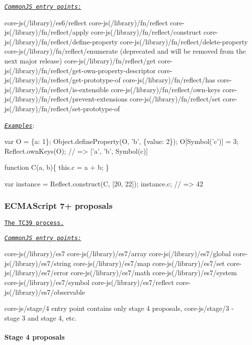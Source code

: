  \href{#commonjs}{\tt {\itshape Common\+JS entry points\+:}} 
\begin{DoxyCode}
core-js(/library)/es6/reflect
core-js(/library)/fn/reflect
core-js(/library)/fn/reflect/apply
core-js(/library)/fn/reflect/construct
core-js(/library)/fn/reflect/define-property
core-js(/library)/fn/reflect/delete-property
core-js(/library)/fn/reflect/enumerate (deprecated and will be removed from the next major release)
core-js(/library)/fn/reflect/get
core-js(/library)/fn/reflect/get-own-property-descriptor
core-js(/library)/fn/reflect/get-prototype-of
core-js(/library)/fn/reflect/has
core-js(/library)/fn/reflect/is-extensible
core-js(/library)/fn/reflect/own-keys
core-js(/library)/fn/reflect/prevent-extensions
core-js(/library)/fn/reflect/set
core-js(/library)/fn/reflect/set-prototype-of
\end{DoxyCode}
 \href{http://goo.gl/gVT0cH}{\tt {\itshape Examples}}\+: 
\begin{DoxyCode}
var O = \{a: 1\};
Object.defineProperty(O, 'b', \{value: 2\});
O[Symbol('c')] = 3;
Reflect.ownKeys(O); // => ['a', 'b', Symbol(c)]

function C(a, b)\{
  this.c = a + b;
\}

var instance = Reflect.construct(C, [20, 22]);
instance.c; // => 42
\end{DoxyCode}


\subsubsection*{E\+C\+M\+A\+Script 7+ proposals}

\href{https://tc39.github.io/process-document/}{\tt The T\+C39 process.}

\href{#commonjs}{\tt {\itshape Common\+JS entry points\+:}} 
\begin{DoxyCode}
core-js(/library)/es7
core-js(/library)/es7/array
core-js(/library)/es7/global
core-js(/library)/es7/string
core-js(/library)/es7/map
core-js(/library)/es7/set
core-js(/library)/es7/error
core-js(/library)/es7/math
core-js(/library)/es7/system
core-js(/library)/es7/symbol
core-js(/library)/es7/reflect
core-js(/library)/es7/observable
\end{DoxyCode}
 {\ttfamily core-\/js/stage/4} entry point contains only stage 4 proposals, {\ttfamily core-\/js/stage/3} -\/ stage 3 and stage 4, etc. \paragraph*{Stage 4 proposals}

